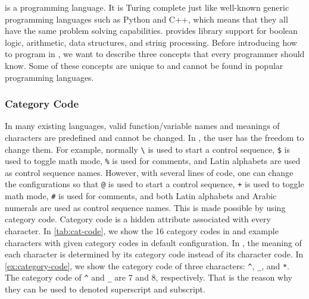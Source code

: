 \documentclass{ltugboat}
\begin{document}
\LT{} is a programming language. 
It is Turing complete just like well-known generic programming languages such as Python and C++, which means that they all have the same problem solving capabilities.
\LT{} provides library support for boolean logic, arithmetic, data structures, and string processing.
Before introducing how to program in \LT{}, we want to describe three concepts that every \LT{} programmer should know.
Some of these concepts are unique to \LT{} and cannot be found in popular programming languages.


\subsubsection{Category Code}
In many existing languages, valid function/variable names and meanings of characters are predefined and cannot be changed.
In \LT{}, the user has the freedom to change them.
For example, normally \verb|\| is used to start a control sequence, \verb|$| is used to toggle math mode, \verb|%| is used for comments, and Latin alphabets are used as control sequence names.
However, with several lines of code, one can change the configurations so that \verb|@| is used to start a control sequence, \verb|+| is used to toggle math mode, \verb|#| is used for comments, and both Latin alphabets and Arabic numerals are used as control sequence names.
This is made possible by using category code.
Category code is a hidden attribute associated with every character.
In \cref{tab:cat-code}, we show the 16 category codes in \LT{} and example characters with given category codes in default \LT{} configuration.
In \LT{}, the meaning of each character is determined by its category code instead of its character code. 
In \cref{ex:category-code}, we show the category code of three characters: \verb|^|, \verb|_|, and \verb|*|.
The category code of \verb|^| and \verb|_| are 7 and 8, respectively. 
That is the reason why they can be used to denoted superscript and subscript.
\end{document}
